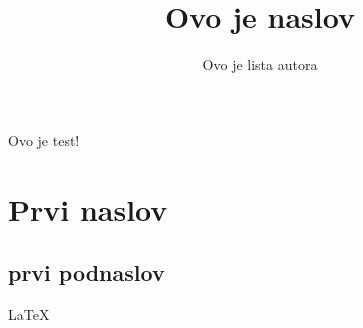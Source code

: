 \documentclass[12pt, letterpaper]{article}
\title{Ovo je naslov}
\author{Ovo je lista autora}
\begin{document}
\maketitle
Ovo je test!

\begin{abstract}
\end{abstract}

\begin{tableofcontents}
\end{tableofcontents}

\section{Prvi naslov}

\subsection{prvi podnaslov}

\begin{center}

\LaTeX

\end{center}
\end{document}
